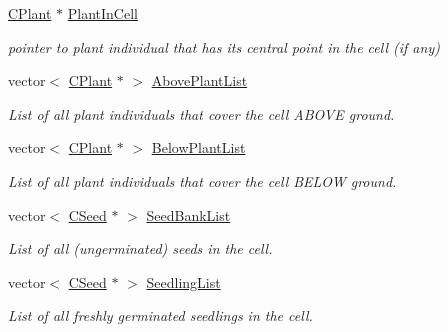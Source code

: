 \begin{DoxyCompactItemize}
\mbox{\label{class_c_cell_a1d0487f95b5a709a4e764a7d1ff643ca}} 
\mbox{\hyperlink{class_c_plant}{C\+Plant}} $\ast$ \mbox{\hyperlink{class_c_cell_a1d0487f95b5a709a4e764a7d1ff643ca}{Plant\+In\+Cell}}
\begin{DoxyCompactList}\small\item\em pointer to plant individual that has its central point in the cell (if any) \end{DoxyCompactList}\item 
\mbox{\label{class_c_cell_ae1c4804658e4ec8b4ea2fd5ed19608bb}} 
vector$<$ \mbox{\hyperlink{class_c_plant}{C\+Plant}} $\ast$ $>$ \mbox{\hyperlink{class_c_cell_ae1c4804658e4ec8b4ea2fd5ed19608bb}{Above\+Plant\+List}}
\begin{DoxyCompactList}\small\item\em List of all plant individuals that cover the cell A\+B\+O\+VE ground. \end{DoxyCompactList}\item 
\mbox{\label{class_c_cell_a76c0bac7ae956fe7e969fc5eb35c3370}} 
vector$<$ \mbox{\hyperlink{class_c_plant}{C\+Plant}} $\ast$ $>$ \mbox{\hyperlink{class_c_cell_a76c0bac7ae956fe7e969fc5eb35c3370}{Below\+Plant\+List}}
\begin{DoxyCompactList}\small\item\em List of all plant individuals that cover the cell B\+E\+L\+OW ground. \end{DoxyCompactList}\item 
\mbox{\label{class_c_cell_a3cf9e5bdc58c5e75289133832f1b8dd2}} 
vector$<$ \mbox{\hyperlink{class_c_seed}{C\+Seed}} $\ast$ $>$ \mbox{\hyperlink{class_c_cell_a3cf9e5bdc58c5e75289133832f1b8dd2}{Seed\+Bank\+List}}
\begin{DoxyCompactList}\small\item\em List of all (ungerminated) seeds in the cell. \end{DoxyCompactList}\item 
\mbox{\label{class_c_cell_a9a9290c141cc35f1308b98ec4bd59998}} 
vector$<$ \mbox{\hyperlink{class_c_seed}{C\+Seed}} $\ast$ $>$ \mbox{\hyperlink{class_c_cell_a9a9290c141cc35f1308b98ec4bd59998}{Seedling\+List}}
\begin{DoxyCompactList}\small\item\em List of all freshly germinated seedlings in the cell. \end{DoxyCompactList}\item 

\end{DoxyCompactItemize}
